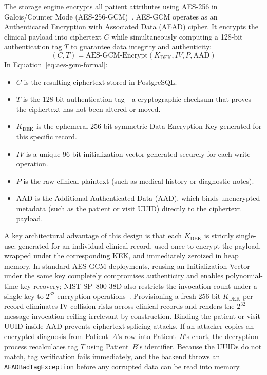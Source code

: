 The storage engine encrypts all patient attributes using AES-256 in Galois/Counter Mode (AES-256-GCM)~\cite{nist_fips_197, dworkin_gcm_2007}. AES-GCM operates as an Authenticated Encryption with Associated Data (AEAD) cipher. It encrypts the clinical payload into ciphertext $C$ while simultaneously computing a 128-bit authentication tag $T$ to guarantee data integrity and authenticity:
\begin{equation}
    (C, T) = \text{AES-GCM-Encrypt}(K_{\text{DEK}}, IV, P, \text{AAD})
    \label{eq:aes-gcm-formal}
\end{equation}
In Equation~\ref{eq:aes-gcm-formal}:
\begin{itemize}
    \item $C$ is the resulting ciphertext stored in PostgreSQL.
    \item $T$ is the 128-bit authentication tag---a cryptographic checksum that proves the ciphertext has not been altered or moved.
    \item $K_{\text{DEK}}$ is the ephemeral 256-bit symmetric Data Encryption Key generated for this specific record.
    \item $IV$ is a unique 96-bit initialization vector generated securely for each write operation.
    \item $P$ is the raw clinical plaintext (such as medical history or diagnostic notes).
    \item $\text{AAD}$ is the Additional Authenticated Data (AAD), which binds unencrypted metadata (such as the patient or visit UUID) directly to the ciphertext payload.
\end{itemize}

A key architectural advantage of this design is that each $K_{\text{DEK}}$ is strictly single-use: generated for an individual clinical record, used once to encrypt the payload, wrapped under the corresponding KEK, and immediately zeroized in heap memory. In standard AES-GCM deployments, reusing an Initialization Vector under the same key completely compromises authenticity and enables polynomial-time key recovery; NIST SP~800-38D also restricts the invocation count under a single key to $2^{32}$ encryption operations~\cite{dworkin_gcm_2007}. Provisioning a fresh 256-bit $K_{\text{DEK}}$ per record eliminates IV collision risks across clinical records and renders the $2^{32}$ message invocation ceiling irrelevant by construction.
Binding the patient or visit UUID inside $\text{AAD}$ prevents ciphertext splicing attacks. If an attacker copies an encrypted diagnosis from Patient~$A$'s row into Patient~$B$'s chart, the decryption process recalculates tag $T$ using Patient~$B$'s identifier. Because the UUIDs do not match, tag verification fails immediately, and the backend throws an \texttt{AEADBadTagException} before any corrupted data can be read into memory.

